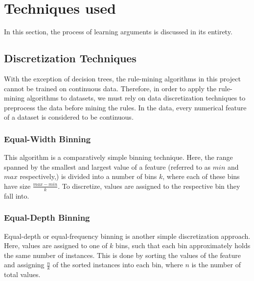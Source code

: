 \chapter{Techniques used}\label{Methodology}

In this section, the process of learning arguments is discussed in its entirety.

\section{Discretization Techniques}\label{Section_Discretization_Techniques}

With the exception of decision trees, the rule-mining algorithms in this project cannot be trained on continuous data. Therefore, in order to apply the rule-mining algorithms to datasets, we must rely on data discretization techniques to preprocess the data before mining the rules. In the data, every numerical feature of a dataset is considered to be continuous.

\subsection*{Equal-Width Binning}
This algorithm is a comparatively simple binning technique. Here, the range spanned by the smallest and largest value of a feature (referred to as $min$ and $max$ respectively,) is divided into a number of bins $k$, where each of these bins have size $\frac{max-min}{k}$. To discretize, values are assigned to the respective bin they fall into.



\subsection*{Equal-Depth Binning}
Equal-depth or equal-frequency binning is another simple discretization approach. Here, values are assigned to one of $k$ bins, such that each bin approximately holds the same number of instances. This is done by sorting the values of the feature and assigning $\frac{n}{k}$ of the sorted instances into each bin, where $n$ is the number of total values.

